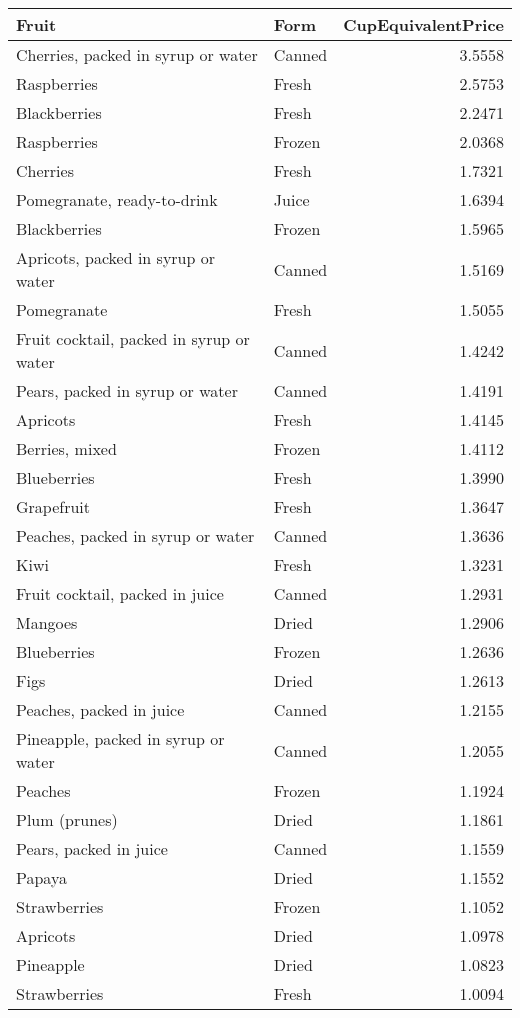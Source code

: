 \documentclass[
]{article}
\begin{document}
\begin{longtable}[t]{llr}
\toprule
Fruit & Form & CupEquivalentPrice\\
\midrule
Cherries, packed in syrup or water & Canned & 3.5558\\
Raspberries & Fresh & 2.5753\\
Blackberries & Fresh & 2.2471\\
Raspberries & Frozen & 2.0368\\
Cherries & Fresh & 1.7321\\
\addlinespace
Pomegranate, ready-to-drink & Juice & 1.6394\\
Blackberries & Frozen & 1.5965\\
Apricots, packed in syrup or water & Canned & 1.5169\\
Pomegranate & Fresh & 1.5055\\
Fruit cocktail, packed in syrup or water & Canned & 1.4242\\
\addlinespace
Pears, packed in syrup or water & Canned & 1.4191\\
Apricots & Fresh & 1.4145\\
Berries, mixed & Frozen & 1.4112\\
Blueberries & Fresh & 1.3990\\
Grapefruit & Fresh & 1.3647\\
\addlinespace
Peaches, packed in syrup or water & Canned & 1.3636\\
Kiwi & Fresh & 1.3231\\
Fruit cocktail, packed in juice & Canned & 1.2931\\
Mangoes & Dried & 1.2906\\
Blueberries & Frozen & 1.2636\\
\addlinespace
Figs & Dried & 1.2613\\
Peaches, packed in juice & Canned & 1.2155\\
Pineapple, packed in syrup or water & Canned & 1.2055\\
Peaches & Frozen & 1.1924\\
Plum (prunes) & Dried & 1.1861\\
\addlinespace
Pears, packed in juice & Canned & 1.1559\\
Papaya & Dried & 1.1552\\
Strawberries & Frozen & 1.1052\\
Apricots & Dried & 1.0978\\
Pineapple & Dried & 1.0823\\
\addlinespace
Strawberries & Fresh & 1.0094\\

\end{longtable}
\end{document}
